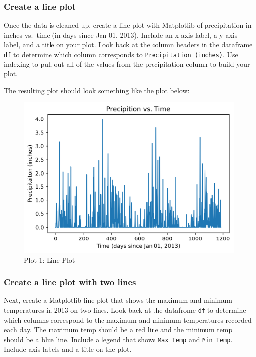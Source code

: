 \documentclass[11pt]{article}
\makeatletter
\def\maxwidth{\ifdim\Gin@nat@width>\linewidth\linewidth
    \else\Gin@nat@width\fi}
\let\Oldincludegraphics\includegraphics
\renewcommand{\includegraphics}[1]{\Oldincludegraphics[width=.8\maxwidth]{#1}}
\makeatother
\begin{document}
    \hypertarget{create-a-line-plot}{%
\subsubsection{Create a line plot}\label{create-a-line-plot}}

Once the data is cleaned up, create a line plot with Matplotlib of
precipitation in inches vs.~time (in days since Jan 01, 2013). Include
an x-axis label, a y-axis label, and a title on your plot. Look back at
the column headers in the dataframe \texttt{df} to determine which
column corresponds to \texttt{Precipitation\ (inches)}. Use indexing to
pull out all of the values from the precipitation column to build your
plot.

The resulting plot should look something like the plot below:

\begin{figure}[h!]
\centering
\includegraphics{images/plot1.png}
\caption{Plot 1: Line Plot}
\end{figure}

\newpage
    \hypertarget{create-a-line-plot-with-two-lines}{%
\subsubsection{Create a line plot with two
lines}\label{create-a-line-plot-with-two-lines}}

Next, create a Matplotlib line plot that shows the maximum and minimum
temperatures in 2013 on two lines. Look back at the datafrome
\texttt{df} to determine which columns correspond to the maximum and
minimum temperatures recorded each day. The maximum temp should be a red
line and the minimum temp should be a blue line. Include a legend that
shows \texttt{Max\ Temp} and \texttt{Min\ Temp}. Include axis labels and
a title on the plot.
\end{document}

